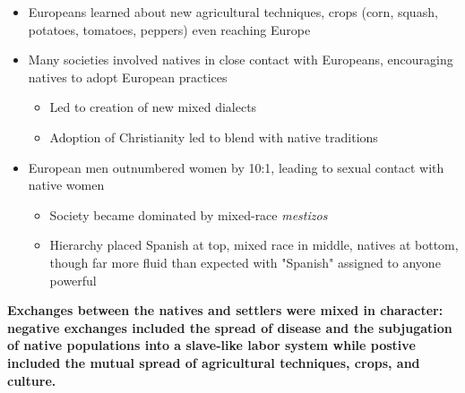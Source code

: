 \documentclass[a4paper]{article}
\begin{document}
{\begin{itemize}
\begin{itemize}
                    \begin{itemize}
                        \item Imported solely for Europeans, but natives slowly learned how to cultivate and harness power
                    \end{itemize}
                    \item Europeans learned about new agricultural techniques, crops (corn, squash, potatoes, tomatoes, peppers) even reaching Europe
                    \item Many societies involved natives in close contact with Europeans, encouraging natives to adopt European practices
                    \begin{itemize}
                        \item Led to creation of new mixed dialects
                        \item Adoption of Christianity led to blend with native traditions
                    \end{itemize}
                    \item European men outnumbered women by 10:1, leading to sexual contact with native women 
                    \begin{itemize}
                        \item Society became dominated by mixed-race \textit{mestizos}
                        \item Hierarchy placed Spanish at top, mixed race in middle, natives at bottom, though far more fluid than expected with "Spanish" assigned to anyone powerful
                    \end{itemize}
                \end{itemize}
            \end{itemize}
            \textbf{Exchanges between the natives and settlers were mixed in character: negative exchanges included the spread of disease and the subjugation of native populations into a slave-like labor system while postive included the mutual spread of agricultural techniques, crops, and culture.}
            }
\end{document}
